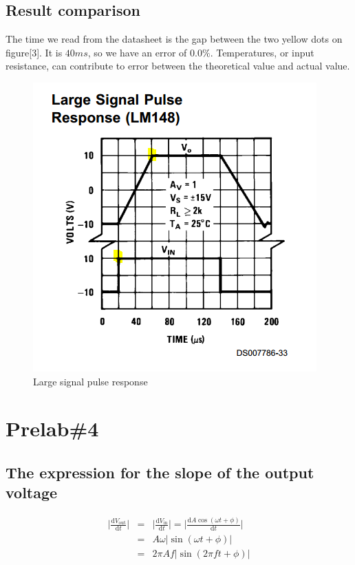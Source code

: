 \documentclass{IEEEtran}
\begin{document}
	\subsection{Result comparison}
	The time we read from the datasheet is the gap between the two yellow dots on figure[3]. It is $40\si{ms}$, so we have an error of $0.0\%$. Temperatures, or input resistance, can contribute to error between the theoretical value and actual value.
	\begin{figure}[!htbp]
		\centering
		\begin{framed}
			\includegraphics[width=\linewidth]{images/3_1.PNG}
			\caption{Large signal pulse response}
		\end{framed}
	\end{figure}
	
	\section{\textbf{Prelab\#4}}
	\subsection{The expression for the slope of the output voltage}
	\begin{eqnarray}
		\bigg|\frac{\mathrm{d}V_{\mathrm{out}}}{\mathrm{d}t}\bigg| & = & \bigg|\frac{\mathrm{d}V_{\mathrm{in}}}{\mathrm{d}t}\bigg| = \bigg|\frac{\mathrm{d}A\cos(\omega t + \phi)}{\mathrm{d}t}\bigg| \\
		& = & A\omega|\sin(\omega t+\phi)| \\
		& = & 2\pi Af|\sin(2\pi ft+\phi)|
	\end{eqnarray}
\end{document}
